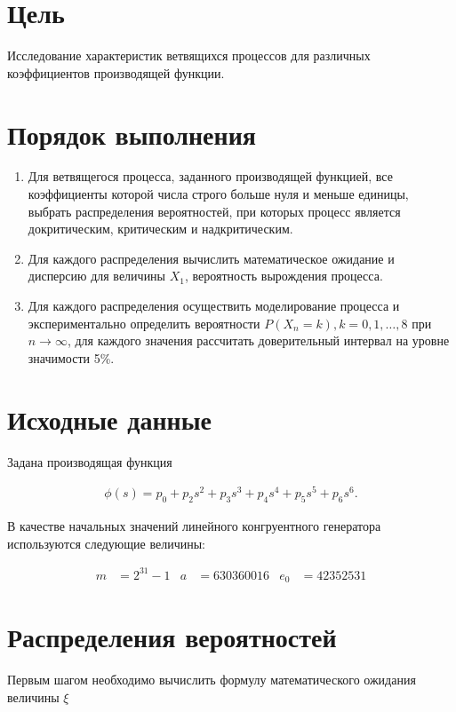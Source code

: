 \section*{Цель}

Исследование характеристик ветвящихся процессов для различных коэффициентов производящей функции.

\section*{Порядок выполнения}

\begin{enumerate}
    \item Для ветвящегося процесса, заданного производящей функцией, все коэффициенты которой числа строго больше нуля и меньше единицы, выбрать распределения вероятностей, при которых процесс является докритическим, критическим и надкритическим.
    \item Для каждого распределения вычислить математическое ожидание и дисперсию для величины $X_1$, вероятность вырождения процесса.
    \item Для каждого распределения осуществить моделирование процесса и экспериментально определить вероятности $P(X_n=k), k = 0,1,\dots,8$ при $n\rightarrow\infty$, для каждого значения рассчитать доверительный интервал на уровне значимости 5\%.
\end{enumerate}

\section*{Исходные данные}

Задана производящая функция

\begin{align*}
    \phi(s) = p_0 + p_2s^2 + p_3s^3 + p_4s^4 + p_5s^5 + p_6s^6.
\end{align*}

В качестве начальных значений линейного конгруентного генератора используются следующие величины:

\begin{align*}
    m & = 2^{31} - 1 & a & = 630360016 & e_0 & = 42352531
\end{align*}

\section*{Распределения вероятностей}

Первым шагом необходимо вычислить формулу математического ожидания величины $\xi$

